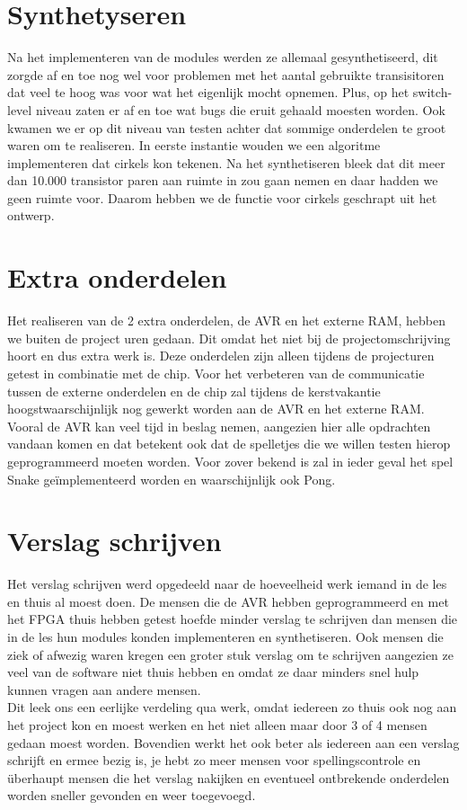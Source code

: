 \documentclass{scrartcl} %
\begin{document}
\section{Synthetyseren}

Na het implementeren van de modules werden ze allemaal gesynthetiseerd, dit zorgde af en toe nog wel voor problemen met het aantal gebruikte transisitoren dat veel te hoog was voor wat het eigenlijk mocht opnemen. Plus, op het switch-level niveau zaten er af en toe 
wat bugs die eruit gehaald moesten worden. Ook kwamen we er op dit niveau van testen achter dat sommige onderdelen te groot waren om te realiseren. In eerste instantie wouden we een algoritme implementeren dat cirkels kon tekenen. Na het synthetiseren bleek dat dit 
meer dan 10.000 transistor paren aan ruimte in zou gaan nemen en daar hadden we geen ruimte voor. Daarom hebben we de functie voor cirkels geschrapt uit het ontwerp.


\section{Extra onderdelen}

Het realiseren van de 2 extra onderdelen, de AVR en het externe RAM, hebben we buiten de project uren gedaan. Dit omdat het niet bij de projectomschrijving hoort en dus extra werk is. Deze onderdelen zijn alleen tijdens de projecturen getest in combinatie met de chip. Voor het verbeteren van de communicatie tussen de externe onderdelen en de chip zal tijdens de kerstvakantie hoogstwaarschijnlijk nog gewerkt worden aan de AVR en het externe RAM. Vooral de AVR kan veel tijd in beslag nemen, aangezien hier alle opdrachten vandaan komen en dat betekent ook dat de spelletjes die we willen testen hierop geprogrammeerd moeten worden. Voor zover bekend is zal in ieder geval het spel Snake geïmplementeerd worden en waarschijnlijk ook Pong.

\section{Verslag schrijven}

Het verslag schrijven werd opgedeeld naar de hoeveelheid werk iemand in de les en thuis al moest doen. De mensen die de AVR hebben geprogrammeerd en met het FPGA thuis hebben getest hoefde minder verslag te schrijven dan mensen die in de les hun modules konden
implementeren en synthetiseren. Ook mensen die ziek of afwezig waren kregen een groter stuk verslag om te schrijven aangezien ze veel van de software niet thuis hebben en omdat ze daar minders snel hulp kunnen vragen aan andere mensen.\\
Dit leek ons een eerlijke verdeling qua werk, omdat iedereen zo thuis ook nog aan het project kon en moest werken en het niet alleen maar door 3 of 4 mensen gedaan moest worden. Bovendien werkt het ook beter als iedereen aan een verslag schrijft en ermee bezig is, je hebt zo meer mensen voor spellingscontrole en überhaupt mensen die het verslag nakijken en eventueel ontbrekende onderdelen worden sneller gevonden en weer toegevoegd. 
\end{document}
